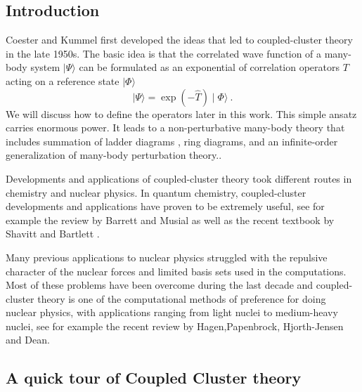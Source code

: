 \subsection{Introduction}
Coester and Kummel first developed the ideas that led to coupled-cluster
theory in the late 1950s. The basic idea is that the correlated wave function
of a many-body system $\mid\Psi\rangle$
can be formulated as an exponential of correlation
operators $T$ acting on a reference state $\mid\Phi\rangle$
\[
\mid\Psi\rangle = \exp\left(-\hat{T}\right)\mid\Phi\rangle\ .
\]
We will discuss how to define the operators later in this work. This simple
ansatz carries enormous power. It leads to a non-perturbative many-body
theory that includes summation of ladder diagrams , ring
diagrams, and an infinite-order
generalization of many-body perturbation theory..

Developments and applications of coupled-cluster theory took different
routes in chemistry and nuclear physics. In quantum chemistry,
coupled-cluster developments and applications have proven to be
extremely useful, see for example the review
by Barrett and Musial as well as the recent textbook
by Shavitt and Bartlett \cite{shavittbartlett2009}.

Many previous applications to nuclear physics struggled
with the repulsive character of the nuclear forces and limited basis
sets used in the computations. Most of these problems have been
overcome during the last decade and coupled-cluster theory is one of
the computational methods of preference for doing nuclear physics,
with applications ranging from light nuclei to medium-heavy nuclei,
see for example the recent review
by Hagen,Papenbrock, Hjorth-Jensen and Dean.


\subsection{A quick tour of Coupled Cluster theory}

